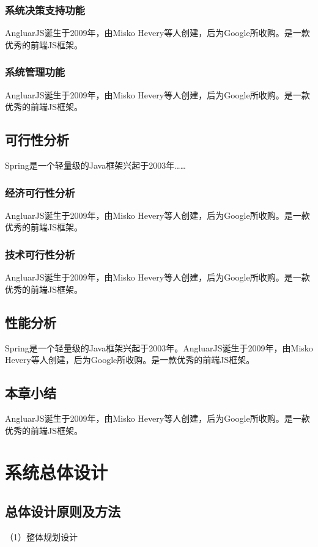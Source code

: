 \documentclass{husethesis}
\begin{document}
\subsubsection{系统决策支持功能}
AngluarJS诞生于2009年，由Misko Hevery等人创建，后为Google所收购。是一款优秀的前端JS框架。

\subsubsection{系统管理功能}
AngluarJS诞生于2009年，由Misko Hevery等人创建，后为Google所收购。是一款优秀的前端JS框架。

\subsection{可行性分析}
Spring是一个轻量级的Java框架兴起于2003年……

\subsubsection{经济可行性分析}
AngluarJS诞生于2009年，由Misko Hevery等人创建，后为Google所收购。是一款优秀的前端JS框架。

\subsubsection{技术可行性分析}
AngluarJS诞生于2009年，由Misko Hevery等人创建，后为Google所收购。是一款优秀的前端JS框架。

\subsection{性能分析}
Spring是一个轻量级的Java框架兴起于2003年。AngluarJS诞生于2009年，由Misko Hevery等人创建，后为Google所收购。是一款优秀的前端JS框架。

\subsection{本章小结}
AngluarJS诞生于2009年，由Misko Hevery等人创建，后为Google所收购。是一款优秀的前端JS框架。
\clearpage


\section{系统总体设计}


\subsection{总体设计原则及方法}
（1）整体规划设计
\end{document}
